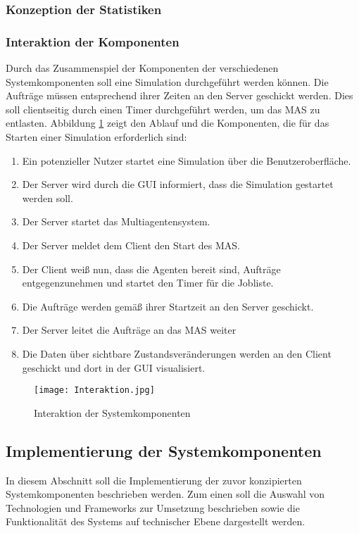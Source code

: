 \subsubsection{Konzeption der Statistiken}
\subsubsection{Interaktion der Komponenten} \label{Interaktion der Komponenten}
Durch das Zusammenspiel der Komponenten der verschiedenen Systemkomponenten soll eine Simulation durchgeführt werden können. Die Aufträge müssen entsprechend ihrer Zeiten an den Server geschickt werden. Dies soll clientseitig durch einen Timer durchgeführt werden, um das MAS zu entlasten. Abbildung \ref{Int} zeigt den Ablauf und die Komponenten, die für das Starten einer Simulation erforderlich sind: 
\begin{enumerate}
\item Ein potenzieller Nutzer startet eine Simulation über die Benutzeroberfläche.
\item Der Server wird durch die GUI informiert, dass die Simulation gestartet werden soll.
\item Der Server startet das Multiagentensystem.
\item Der Server meldet dem Client den Start des MAS.
\item Der Client weiß nun, dass die Agenten bereit sind, Aufträge entgegenzunehmen und startet den Timer für die Jobliste.
\item Die Aufträge werden gemäß ihrer Startzeit an den Server geschickt.
\item Der Server leitet die Aufträge an das MAS weiter
\item Die Daten über sichtbare Zustandsveränderungen werden an den Client geschickt und dort in der GUI visualisiert.
\end{enumerate}

\begin{figure}[h!]
	\centering
		\texttt{[image: Interaktion.jpg]}        
		\caption{Interaktion der Systemkomponenten}
	\label{Int}
\end{figure}
\newpage
\subsection{Implementierung der Systemkomponenten}
In diesem Abschnitt soll die Implementierung der zuvor konzipierten Systemkomponenten beschrieben werden. Zum einen soll die Auswahl von Technologien und Frameworks zur Umsetzung beschrieben sowie die Funktionalität des Systems auf technischer Ebene dargestellt werden.
